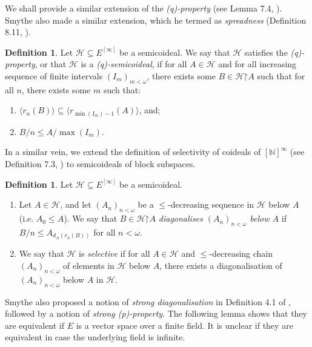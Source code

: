 \documentclass[10pt,a4paper]{amsart}
\theoremstyle{plain}
\numberwithin{equation}{section}
\theoremstyle{definition}
\newtheorem{definition}[theorem]{Definition}
\renewcommand{\c}[1]{\langle #1 \rangle}
\newcommand{\N}{\mathbb{N}}
\newcommand{\cal}{\mathcal}
\newcommand{\restrictedto}{\mathord{\upharpoonright}}
\renewcommand{\H}{\cal{H}}
\begin{document}
We shall provide a similar extension of the \emph{(q)-property} (see Lemma 7.4, \cite{T10}). Smythe also made a similar extension, which he termed as \emph{spreadness} (Definition 8.11, \cite{S18}).

\begin{definition}
\label{def:(q)-semicoideal}
    Let $\H \subseteq E^{[\infty]}$ be a semicoideal. We say that $\H$ satisfies the \emph{(q)-property}, or that $\H$ is a \emph{(q)-semicoideal}, if for all $A \in \H$ and for all increasing sequence of finite intervals $(I_m)_{m<\omega}$, there exists some $B \in \H\restrictedto A$ such that for all $n$, there exists some $m$ such that:
    \begin{enumerate}
        \item $\c{r_n(B)} \subseteq \c{r_{\min(I_m)-1}(A)}$, and;

        \item $B/n \leq A/\max(I_m)$.
    \end{enumerate}
\end{definition}

In a similar vein, we extend the definition of selectivity of coideals of $[\N]^\infty$ (see Definition 7.3, \cite{T10}) to semicoideals of block subspaces.

\begin{definition}
\label{def:selective}
    Let $\H \subseteq E^{[\infty]}$ be a semicoideal.
    \begin{enumerate}
        \item Let $A \in \H$, and let $(A_n)_{n<\omega}$ be a $\leq$-decreasing sequence in $\H$ below $A$ (i.e. $A_0 \leq A$). We say that $B \in \H\restrictedto A$ \emph{diagonalises $(A_n)_{n<\omega}$ below $A$} if $B/n \leq A_{d_A(r_n(B))}$ for all $n < \omega$.

        \item We say that $\H$ is \emph{selective} if for all $A \in \H$ and $\leq$-decreasing chain $(A_n)_{n<\omega}$ of elements in $\H$ below $A$, there exists a diagonalisation of $(A_n)_{n<\omega}$ below $A$ in $\H$. 
    \end{enumerate}
\end{definition}

Smythe also proposed a notion of \emph{strong diagonalisation} in Definition 4.1 of \cite{S18}, followed by a notion of \emph{strong (p)-property}. The following lemma shows that they are equivalent if $E$ is a vector space over a finite field. It is unclear if they are equivalent in case the underlying field is infinite.
\end{document}
